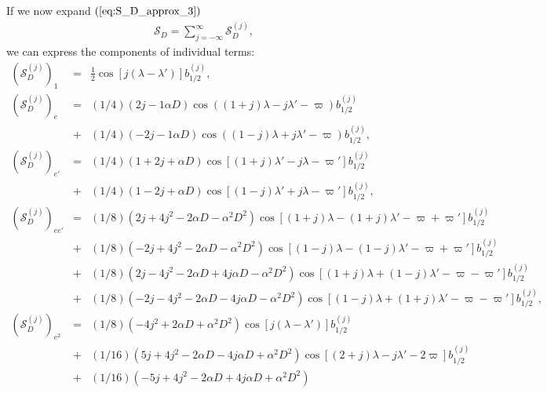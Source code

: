 \documentclass [12pt, a4paper] {article}
\begin{document}
If we now expand $(\ref{eq:S_D_approx_3})$
\begin {eqnarray}
    \mathcal{S}_D = \sum_{j=-\infty}^\infty \mathcal{S}_D^{(j)},
\end {eqnarray}
we can express the components of individual terms:
\newpage
\begin {eqnarray}
    \left(\mathcal{S}_D^{(j)}\right)_1 &=& \frac{1}{2}\cos[j(\lambda - \lambda')]
    b_{1/2}^{(j)}, 
    \\
    \left(\mathcal{S}_D^{(j)}\right)_e &=& 
    (1/4)\left(2j-1\alpha D\right)\cos((1+j)\lambda - j\lambda' - \varpi)
    b_{1/2}^{(j)}
    \\\nonumber
    &+& 
    (1/4)\left(-2j-1\alpha D\right)\cos((1-j)\lambda + j\lambda' - \varpi) 
    b_{1/2}^{(j)},
    \\
    \left(\mathcal{S}_D^{(j)}\right)_{e'} &=& 
    (1/4)
    \left(
        1 + 2j + \alpha D
    \right)
    \cos[(1 + j)\lambda' - j\lambda - \varpi']
    b_{1/2}^{(j)}
    \\\nonumber 
    &+&
    (1/4)
    \left(
        1 - 2j + \alpha D
    \right)
    \cos[(1 - j)\lambda' + j\lambda - \varpi']
    b_{1/2}^{(j)},
    \\
    \left(\mathcal{S}_D^{(j)}\right)_{ee'} &=& 
    (1/8)
    \left(
        2j + 4j^2 - 2\alpha D - \alpha^2D^2
    \right)
    \cos[(1+j)\lambda - (1+j)\lambda' - \varpi + \varpi']
    b_{1/2}^{(j)}
    \quad\quad
    \\\nonumber
    &+&
    (1/8)
    \left(
        -2j + 4j^2 - 2\alpha D - \alpha^2D^2
    \right)
    \cos[(1-j)\lambda - (1-j)\lambda' - \varpi + \varpi']
    b_{1/2}^{(j)}
    \\\nonumber
    &+&
    (1/8)
    \left(
        2j - 4j^2 - 2\alpha D + 4j\alpha D - \alpha^2D^2
    \right)
    \cos[(1+j)\lambda + (1-j)\lambda' - \varpi - \varpi']
    b_{1/2}^{(j)}
    \\\nonumber
    &+&
    (1/8)
    \left(
        -2j -4j^2 - 2\alpha D - 4j\alpha D - \alpha^2D^2
    \right)
    \cos[(1-j)\lambda + (1+j)\lambda' - \varpi - \varpi']
    b_{1/2}^{(j)},
    \\
    \left(\mathcal{S}_D^{(j)}\right)_{e^2} &=& 
    (1/8)\left(-4j^2 + 2\alpha D + \alpha^2D^2\right)\cos[j(\lambda - \lambda')]
    b_{1/2}^{(j)}
    \\\nonumber
    &+& 
    (1/16)\left(5j + 4j^2 - 2\alpha D - 4j\alpha D + \alpha^2D^2\right)
    \cos[(2 + j)\lambda - j\lambda' - 2\varpi]
    b_{1/2}^{(j)}
    \\\nonumber
    &+& 
    (1/16)\left(-5j + 4j^2 -2\alpha D + 4j\alpha D + \alpha^2D^2\right)

\end{eqnarray}
\end{document}
